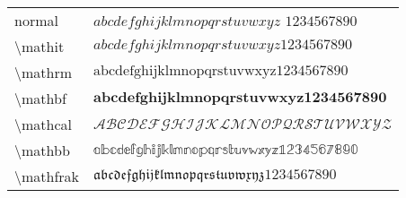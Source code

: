 \documentclass[
    luatex,
    japanese,
    unicode,
    titlepage,
    pdfusetitle
]{ltjsarticle}
\begin{document}
    \pagestyle{empty}

    \begin{tabular}{ll}
        normal & $abcdefghijklmnopqrstuvwxyz$ $1234567890$ \\
        \textbackslash mathit & $\mathit{abcdefghijklmnopqrstuvwxyz1234567890}$ \\
        \textbackslash mathrm & $\mathrm{abcdefghijklmnopqrstuvwxyz1234567890}$ \\
        \textbackslash mathbf & $\mathbf{abcdefghijklmnopqrstuvwxyz1234567890}$ \\
        \textbackslash mathcal & $\mathcal{ABCDEFGHIJKLMNOPQRSTUVWXYZ}$ \\
        \textbackslash mathbb & $\mathbb{abcdefghijklmnopqrstuvwxyz1234567890}$ \\
        \textbackslash mathfrak & $\mathfrak{abcdefghijklmnopqrstuvwxyz1234567890}$
    \end{tabular}
\end{document}

